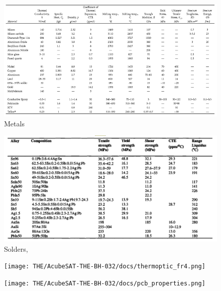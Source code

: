 \documentclass[final]{cubedoc}
\begin{document}
	\begin{figure}[h!]
		\centering
		\includegraphics[keepaspectratio, height=.8\textheight, width=\textwidth]{docs/blackwell_prope.png}
		\caption{Metals \cite[p.526]{blackwell2017electronic}}
		\label{fig:emissivity_table}
	\end{figure}
	
	\begin{figure}[h!]
		\centering
		\includegraphics[keepaspectratio, height=.8\textheight, width=\textwidth]{docs/soldes.png}
		\caption{Solders, \cite[p.53]{pecht1998electronic}}
		\label{fig:metals}
	\end{figure}
	
	\begin{figure}[h!]
		\centering
		\texttt{[image: THE/AcubeSAT-THE-BH-032/docs/thermoptic\_fr4.png]}
		\caption{\cite{ganti2017design}}
		\label{fig:thermoopticfr4}
	\end{figure}
	
	\begin{figure}[h!]
		\centering
		\texttt{[image: THE/AcubeSAT-THE-BH-032/docs/pcb\_properties.png]}
		\caption{\cite{teng1997thermal}}
		\label{fig:pcb_level}
	\end{figure}
	
\end{document}

